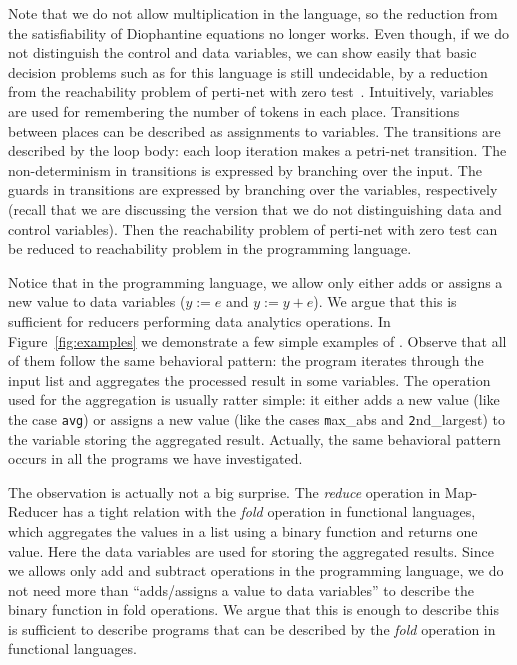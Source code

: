 \documentclass[runningheads,a4paper]{llncs}
\begin{document}
Note that we do not allow multiplication in the language, so the reduction from the satisfiability of Diophantine equations no longer works. Even though, if we do not distinguish the control and data variables, we can show easily that basic decision problems such as for this language is still undecidable, by a reduction from the reachability problem of perti-net with zero test~\cite{petri}.
Intuitively, variables are used for remembering the number of tokens in each place. Transitions between places can be described as assignments to variables. The transitions are described by the loop body: each loop iteration makes a petri-net transition. 
The non-determinism in transitions is expressed by branching over the input. 
The guards in transitions are expressed by branching over the variables, respectively (recall that we are discussing the version that we do not distinguishing data and control variables). Then the reachability problem of perti-net with zero test can be reduced to reachability problem in the programming language.

Notice that in the programming language, we allow only either adds or assigns a new value to data variables ($y := e$ and $y := y+e$). We argue that this is sufficient for reducers performing data analytics operations.
In Figure~\ref{fig:examples} we demonstrate a few simple examples of . Observe that all of them follow the same behavioral pattern: the program iterates through the input list and aggregates the processed result in some variables. The operation used for the aggregation is usually ratter simple: it either adds a new value (like the case \texttt{avg}) or assigns a new value (like the cases {\texttt max\_abs} and {\texttt 2nd\_largest}) to the variable storing the aggregated result. Actually, the same behavioral pattern occurs in all the programs we have investigated.

The observation is actually not a big surprise. The \emph{reduce} operation in Map-Reducer has a tight relation with the \emph{fold} operation in functional languages, which aggregates the values in a list using a binary function and returns one value. Here the data variables are used for storing the aggregated results. Since we allows only add and subtract operations in the programming language, we do not need more than ``adds/assigns a value to data variables'' to describe the binary function in fold operations. We argue that this is enough to describe this is sufficient to describe programs that can be described by the \emph{fold} operation in functional languages.
\end{document}
